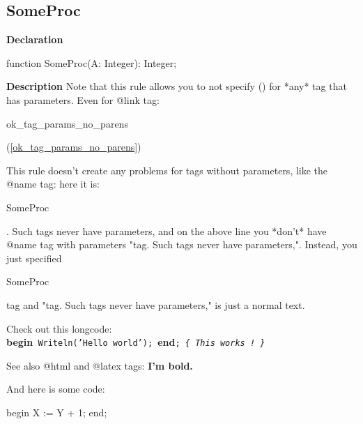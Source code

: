 \documentclass{report}
\begin{document}
\subsection*{SomeProc}
\begin{list}{}{
\setlength{\itemindent}{0cm}
\setlength{\listparindent}{0cm}
\setlength{\leftmargin}{\evensidemargin}
\addtolength{\leftmargin}{\tmplength}
\settowidth{\labelsep}{X}
\addtolength{\leftmargin}{\labelsep}
\setlength{\labelwidth}{\tmplength}
}
\begin{flushleft}
\item[\textbf{Declaration}\hfill]
\begin{ttfamily}
function SomeProc(A: Integer): Integer;\end{ttfamily}


\end{flushleft}
\par
\item[\textbf{Description}]
Note that this rule allows you to not specify () for *any* tag that has parameters. Even for @link tag: \begin{ttfamily}ok{\_}tag{\_}params{\_}no{\_}parens\end{ttfamily}(\ref{ok_tag_params_no_parens})

This rule doesn't create any problems for tags without parameters, like the @name tag: here it is: \begin{ttfamily}SomeProc\end{ttfamily}. Such tags never have parameters, and on the above line you *don't* have @name tag with parameters "tag. Such tags never have parameters,". Instead, you just specified \begin{ttfamily}SomeProc\end{ttfamily} tag and "tag. Such tags never have parameters," is just a normal text.

Check out this longcode: \texttt{}\textbf{begin}\texttt{~Writeln('Hello~world');~}\textbf{end}\texttt{;~\textit{{\{}~This~works~!~{\}}}\\
}

See also @html and @latex tags:  {\bf I'm bold.}

And here is some code: \begin{ttfamily}begin X := Y + 1; end;\end{ttfamily}


\end{list}
\end{document}
